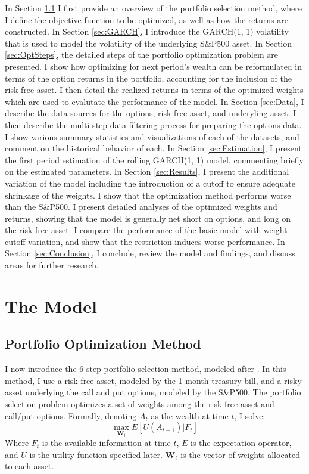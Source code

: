 In Section \ref{sec:Method} I first provide an overview of the portfolio selection method, where I define the objective function to be optimized, as well as how the returns are constructed. In Section \ref{sec:GARCH}, I introduce the GARCH(1, 1) volatility that is used to model the volatility of the underlying S\&P500 asset. In Section \ref{sec:OptSteps}, the detailed steps of the portfolio optimization problem are presented. I show how optimizing for next period's wealth can be reformulated in terms of the option returns in the portfolio, accounting for the inclusion of the risk-free asset. I then detail the realized returns in terms of the optimized weights which are used to evalutate the performance of the model. In Section \ref{sec:Data}, I describe the data sources for the options, risk-free asset, and underyling asset. I then describe the multi-step data filtering process for preparing the options data. I show various summary statistics and visualizations of each of the datasets, and comment on the historical behavior of each. In Section \ref{sec:Estimation}, I present the first period estimation of the rolling GARCH(1, 1) model, commenting briefly on the estimated parameters. In Section \ref{sec:Results}, I present the additional variation of the model including the introduction of a cutoff to ensure adequate shrinkage of the weights. I show that the optimization method performs worse than the S\&P500. I present detailed analyses of the optimized weights and returns, showing that the model is generally net short on options, and long on the risk-free asset. I compare the performance of the basic model with weight cutoff variation, and show that the restriction induces worse performance. In Section \ref{sec:Conclusion}, I conclude, review the model and findings, and discuss areas for further research.

\section{The Model}\label{sec:Model}

\subsection{Portfolio Optimization Method}\label{sec:Method}

I now introduce the 6-step portfolio selection method, modeled after \cite{faias2017optimal}. In this method, I use a risk free asset, modeled by the 1-month treasury bill, and a risky asset underlying the call and put options, modeled by the S\&P500. The portfolio selection problem optimizes a set of weights among the risk free asset and call/put options. Formally, denoting $A_{t}$ as the wealth at time $t$, I solve:
\noindent
\[\max_{\mathbf{W}_{t}} E[U(A_{t+1})|F_{t}]\]
\noindent
Where $F_{t}$ is the available information at time $t$, $E$ is the expectation operator, and $U$ is the utility function specified later. $\mathbf{W}_{t}$ is the vector of weights allocated to each asset.

